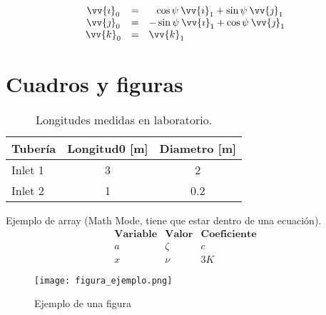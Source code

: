\documentclass{article} %
\begin{document}
\begin{equation}
    \begin{array}{ccl}
        \vv{\imath}_0 &=& \enspace\;\cos{\psi}\:\vv{\imath}_1 + \sin{\psi}\:\vv{\jmath}_1\\
        \vv{\jmath}_0 &=& -\sin{\psi}\:\vv{\imath}_1 + \cos{\psi}\:\vv{\jmath}_1\\
        \vv{k}_0 &=& \vv{k}_1
    \end{array}
    \label{eq:versores0from1}
\end{equation}

\clearpage %

\section{Cuadros y figuras}
\begin{table}[h!]
    \centering
    \caption{Longitudes medidas en laboratorio.}
    \label{cuadro:longitudes}
    \begin{tabular}{l|cc} %
         \textbf{Tubería} & \textbf{Longitud0 [m]} & \textbf{Diametro} [m] \\
         \hline %
         Inlet 1          & 3                & 2               \\
         Inlet 2          & 1                & 0.2         
    \end{tabular}
\end{table}

Ejemplo de array (Math Mode, tiene que estar dentro de una ecuación).
\begin{equation}
    \label{cuadro:variables}
    \begin{array}{ccc}
         \textbf{Variable} & \textbf{Valor} & \textbf{Coeficiente} \\
        \hline
        a         & \zeta            & c         \\
        x         & \nu              & 3K
    \end{array}
\end{equation}

\begin{figure}[h!]
    \centering
    \texttt{[image: figura\_ejemplo.png]}
    \caption{Ejemplo de una figura}
    \label{fig:figura_de_algo}
\end{figure}
\end{document}
